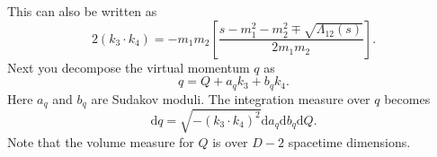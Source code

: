 This can also be written as
\begin{equation}
	2 (k_{3} \cdot k_{4}) = -m_{1} m_{2} \left[ \frac{s - m_{1}^{2} - m_{2}^{2} \mp \sqrt{\Lambda_{12}(s)}}{2 m_{1} m_{2}} \right].
\end{equation}
Next you decompose the virtual momentum $q$ as
\begin{equation}
	q = Q + a_{q} k_{3} + b_{q} k_{4}.
\end{equation}
Here $a_{q}$ and $b_{q}$ are Sudakov moduli. The integration measure over $q$ becomes
\begin{equation}
	\mathrm{d}q = \sqrt{{-\left(k_{3} \cdot k_{4}\right)^{2}}} \mathrm{d}a_{q} \mathrm{d}b_{q} \mathrm{d}Q.
\end{equation}
Note that the volume measure for $Q$ is over $D-2$ spacetime dimensions.

